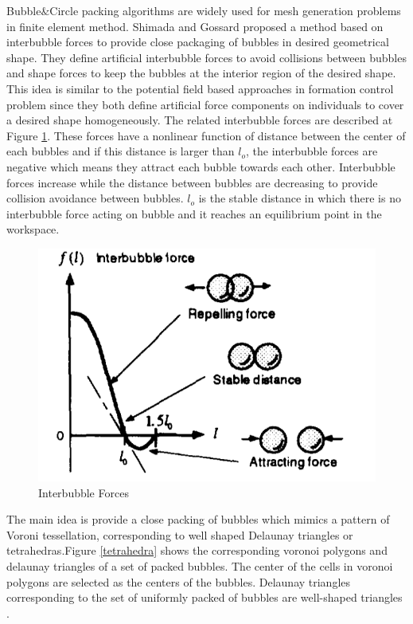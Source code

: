Bubble$\&$Circle packing algorithms are widely used for mesh generation problems in finite element method. Shimada and Gossard \cite{27} proposed a method based on interbubble forces to provide close packaging of bubbles in desired geometrical shape. They define artificial interbubble forces to avoid collisions between bubbles and shape forces to keep the bubbles at the interior region of the desired shape. This idea is similar to the potential field based approaches in formation control problem since they both define artificial force components on individuals to cover a desired shape homogeneously. The related interbubble forces are described at Figure \ref{interbubble_ref}. These forces have a nonlinear function of distance between the center of each bubbles and if this distance is larger than $l_o$, the interbubble forces are negative which means they attract each bubble towards each other. Interbubble forces increase while the distance between bubbles are decreasing to provide collision avoidance between bubbles. $l_o$ is the stable distance in which there is no interbubble force acting on bubble and it reaches an equilibrium point in the workspace.

\begin{figure}[H]
	\caption{Interbubble Forces \cite{27}} \label{interbubble_ref}
	\centering
	\includegraphics[scale = 0.22]{interbubble}
\end{figure}

The main idea is provide a close packing of bubbles which mimics a pattern of Voroni tessellation, corresponding to well shaped Delaunay triangles or tetrahedras.Figure \ref{tetrahedra} shows the corresponding voronoi polygons and delaunay triangles of a set of packed bubbles. The center of the cells in voronoi polygons are selected as the centers of the bubbles. Delaunay triangles corresponding to the set of uniformly packed of bubbles are well-shaped triangles \cite{27}. 


